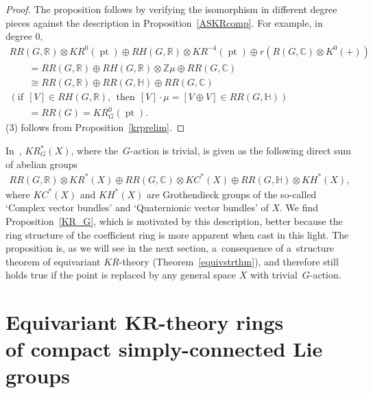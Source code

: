 \documentclass[11pt]{article}
\numberwithin{equation}{section}
\DeclareMathOperator{\pt}{pt}
\begin{document}
\begin{proof}
The proposition
follows by verifying the isomorphism in dif\/ferent degree pieces against the description in
Proposition~\ref{ASKRcomp}.
For example, in degree 0,
\begin{gather*}
RR(G, \mathbb{R})\otimes KR^0(\pt)\oplus RH(G, \mathbb{R})\otimes KR^{-4}(\pt)\oplus r(R(G,
\mathbb{C})\otimes K^0(+))
\\
\qquad=RR(G, \mathbb{R})\oplus RH(G, \mathbb{R})\otimes \mathbb{Z}\mu\oplus RR(G, \mathbb{C})
\\
\qquad
\cong RR(G, \mathbb{R})\oplus RR(G, \mathbb{H})\oplus RR(G, \mathbb{C})
\\
(\text{if} \ \ [V]\in RH(G, \mathbb{R}),\ \ \text{then} \ \ [V]\cdot\mu=[V\oplus V]\in RR(G, \mathbb{H}))
\\
\qquad=RR(G)
=KR^0_G(\pt).
\end{gather*}
(3) follows from Proposition~\ref{krprelim}.
\end{proof}
\begin{Remark}
In~\cite{AS}, $KR_G^*(X)$, where the~$G$-action is trivial, is given as the following direct sum of abelian groups
\begin{gather*}
RR(G, \mathbb{R})\otimes KR^*(X)\oplus RR(G, \mathbb{C})\otimes KC^*(X)\oplus RR(G, \mathbb{H})\otimes KH^*(X),
\end{gather*}
where $KC^*(X)$ and $KH^*(X)$ are Grothendieck groups of the so-called `Complex vector bundles' and `Quaternionic vector
bundles' of $X$.
We f\/ind Proposition~\ref{KR_G}, which is motivated by this description, better because the ring structure of the
coef\/f\/icient ring is more apparent when cast in this light.
The proposition
is, as we will see in the next section, a~consequence of a~structure theorem of equivariant $KR$-theory
(Theorem~\ref{equivstrthm}), and therefore still holds true if the point is replaced by any general space $X$ with
trivial~$G$-action.
\end{Remark}

\section[Equivariant $KR$-theory rings of compact simply-connected Lie groups]{Equivariant
$\boldsymbol{KR}$-theory rings \\ of compact simply-connected Lie groups}\label{Section4}
\end{document}
